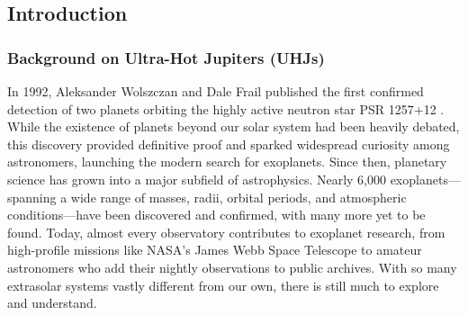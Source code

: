 \documentclass[oneside,12pt]{amsart}
\numberwithin{page}{section}
\begin{document}

\subsection{Introduction}\label{sec:intro}

\subsubsection{Background on Ultra-Hot Jupiters (UHJs)}


In 1992, Aleksander Wolszczan and Dale Frail published the first confirmed detection of two planets orbiting the highly active neutron star PSR 1257+12 \citep{wolszczan1992planetary}. While the existence of planets beyond our solar system had been heavily debated, this discovery provided definitive proof and sparked widespread curiosity among astronomers, launching the modern search for exoplanets. Since then, planetary science has grown into a major subfield of astrophysics. Nearly 6,000 exoplanets—spanning a wide range of masses, radii, orbital periods, and atmospheric conditions—have been discovered and confirmed, with many more yet to be found. Today, almost every observatory contributes to exoplanet research, from high-profile missions like NASA's James Webb Space Telescope to amateur astronomers who add their nightly observations to public archives. With so many extrasolar systems vastly different from our own, there is still much to explore and understand.
\end{document}
